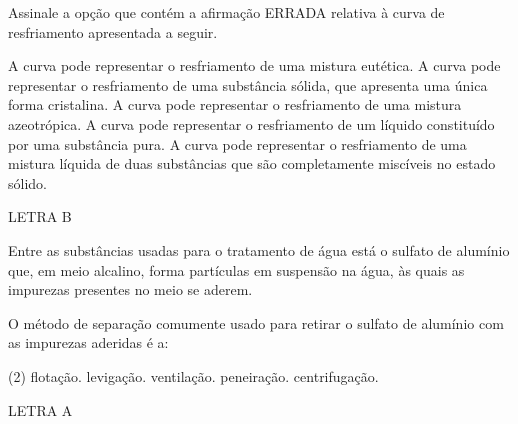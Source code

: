 \documentclass[9 pt]{scrartcl}
\def\PQ{0.84} %
\begin{document}
\begin{exercise}[points=\PQ]
Assinale a opção que contém a afirmação ERRADA relativa à curva de resfriamento apresentada a seguir.


\begin{choice}
\choice A curva pode representar o resfriamento de uma mistura eutética.
\choice  A curva pode representar o resfriamento de uma substância sólida, que apresenta uma única forma cristalina.
\choice  A curva pode representar o resfriamento de uma mistura azeotrópica.
\choice A curva pode representar o resfriamento de um líquido constituído por uma substância pura.
\choice  A curva pode representar o resfriamento de uma mistura líquida de duas substâncias que são completamente miscíveis no estado sólido.
\end{choice}
\end{exercise}
\begin{solution}
LETRA B
\end{solution}


\begin{exercise}[points=\PQ]
Entre as substâncias usadas para o tratamento de água está o sulfato de alumínio que, em meio alcalino, forma partículas em suspensão na água, às quais as impurezas presentes no meio se aderem.

O método de separação comumente usado para retirar o sulfato de alumínio com as impurezas aderidas é a:
\begin{choice}(2)
\choice flotação.
\choice levigação.
\choice  ventilação.
\choice  peneiração.
\choice  centrifugação.
\end{choice}
\end{exercise}
\begin{solution}
LETRA A
\end{solution}
\end{document}
